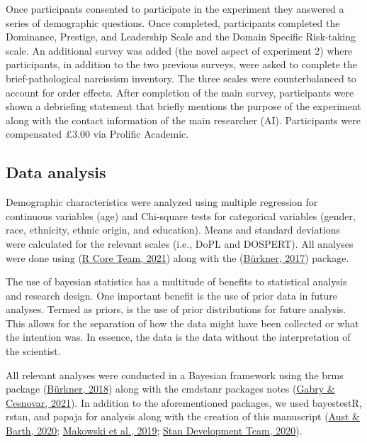 \documentclass[
  donotrepeattitle,doc, 12pt, a4paper,floatsintext]{apa7}
\begin{document}
Once participants consented to participate in the experiment they answered a series of demographic questions. Once completed, participants completed the Dominance, Prestige, and Leadership Scale and the Domain Specific Risk-taking scale. An additional survey was added (the novel aspect of experiment 2) where participants, in addition to the two previous surveys, were asked to complete the brief-pathological narcissism inventory. The three scales were counterbalanced to account for order effects. After completion of the main survey, participants were shown a debriefing statement that briefly mentions the purpose of the experiment along with the contact information of the main researcher (AI). Participants were compensated £3.00 via Prolific Academic.

\hypertarget{data-analysis-1}{%
\subsection{Data analysis}\label{data-analysis-1}}

Demographic characteristics were analyzed using multiple regression for continuous variables (age) and Chi-square tests for categorical variables (gender, race, ethnicity, ethnic origin, and education). Means and standard deviations were calculated for the relevant scales (i.e., DoPL and DOSPERT). All analyses were done using (\protect\hyperlink{ref-rcoreteam2021}{R Core Team, 2021}) along with the (\protect\hyperlink{ref-burkner2017}{Bürkner, 2017}) package.

The use of bayesian statistics has a multitude of benefits to statistical analysis and research design. One important benefit is the use of prior data in future analyses. Termed as priors, is the use of prior distributions for future analysis. This allows for the separation of how the data might have been collected or what the intention was. In essence, the data is the data without the interpretation of the scientist.

All relevant analyses were conducted in a Bayesian framework using the brms package (\protect\hyperlink{ref-burkner2018}{Bürkner, 2018}) along with the cmdstanr packages notes (\protect\hyperlink{ref-gabry2021}{Gabry \& Cesnovar, 2021}). In addition to the aforementioned packages, we used bayestestR, rstan, and papaja for analysis along with the creation of this manuscript (\protect\hyperlink{ref-aust2020}{Aust \& Barth, 2020}; \protect\hyperlink{ref-makowski2019}{Makowski et al., 2019}; \protect\hyperlink{ref-standevelopmentteam2020}{Stan Development Team, 2020}).
\end{document}
